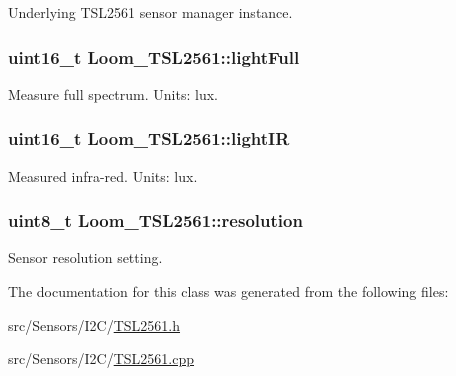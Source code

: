 Underlying T\+S\+L2561 sensor manager instance. 

\subsubsection[{\texorpdfstring{light\+Full}{lightFull}}]{\setlength{\rightskip}{0pt plus 5cm}uint16\+\_\+t Loom\+\_\+\+T\+S\+L2561\+::light\+Full\hspace{0.3cm}{\ttfamily [protected]}}\hypertarget{class_loom___t_s_l2561_a0b91894008dd82a63b4401794275fb2f}{}\label{class_loom___t_s_l2561_a0b91894008dd82a63b4401794275fb2f}


Measure full spectrum. Units\+: lux. 

\subsubsection[{\texorpdfstring{light\+IR}{lightIR}}]{\setlength{\rightskip}{0pt plus 5cm}uint16\+\_\+t Loom\+\_\+\+T\+S\+L2561\+::light\+IR\hspace{0.3cm}{\ttfamily [protected]}}\hypertarget{class_loom___t_s_l2561_a290105175178ce8cbc47d8d2b958d7f8}{}\label{class_loom___t_s_l2561_a290105175178ce8cbc47d8d2b958d7f8}


Measured infra-\/red. Units\+: lux. 

\subsubsection[{\texorpdfstring{resolution}{resolution}}]{\setlength{\rightskip}{0pt plus 5cm}uint8\+\_\+t Loom\+\_\+\+T\+S\+L2561\+::resolution\hspace{0.3cm}{\ttfamily [protected]}}\hypertarget{class_loom___t_s_l2561_a600b48b5fa17b6777fa343cdf145f382}{}\label{class_loom___t_s_l2561_a600b48b5fa17b6777fa343cdf145f382}


Sensor resolution setting. 



The documentation for this class was generated from the following files\+:\begin{DoxyCompactItemize}
\item 
src/\+Sensors/\+I2\+C/\hyperlink{_t_s_l2561_8h}{T\+S\+L2561.\+h}\item 
src/\+Sensors/\+I2\+C/\hyperlink{_t_s_l2561_8cpp}{T\+S\+L2561.\+cpp}\end{DoxyCompactItemize}
